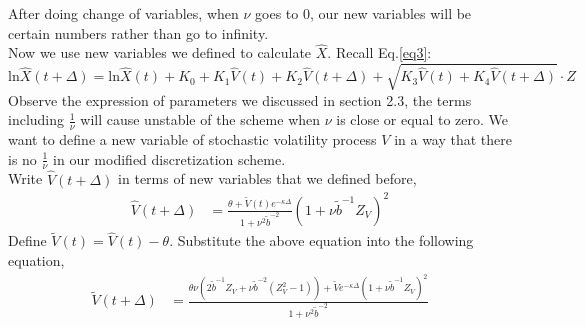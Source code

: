 \documentclass{ws-ijfe}
\begin{document}
After doing change of variables, when $\nu$ goes to $0$, our new variables will be certain numbers rather than go to infinity.\\
Now we use new variables we defined to calculate $\hat{X}$. Recall Eq.\eqref{eq3}:
\begin{equation*}
  \text{ln}\hat{X}(t+\Delta)=\text{ln}\hat{X}(t)+K_0+K_1\hat{V}(t)+K_2\hat{V}(t+\Delta)+\sqrt{K_3\hat{V}(t)+K_4\hat{V}(t+\Delta)}\cdot Z
\end{equation*}
Observe the expression of parameters we discussed in section 2.3, the terms including $\frac{1}{\nu}$ will cause unstable of the scheme when $\nu$ is close or equal to zero. We want to define a new variable of stochastic volatility process $V$ in a way that there is no $\frac{1}{\nu}$ in our modified discretization scheme.\\
Write $\hat{V}(t+\Delta)$ in terms of new variables that we defined before,
\begin{equation*}
\begin{split}
\hat{V}(t+\Delta)%
&=\frac{\theta+\tilde{V}(t)e^{-\kappa\Delta}}{1+\nu^2\tilde{b}^{-2}}(1+\nu\tilde{b}^{-1}Z_V)^2
\end{split}
\end{equation*}
Define $\tilde{V}(t)=\hat{V}(t)-\theta$.
Substitute the above equation into the following equation,
\begin{equation*}
\begin{split}
\tilde{V}(t+\Delta)%
&=\frac{\theta\nu(2\tilde{b}^{-1}Z_V+\nu\tilde{b}^{-2}(Z_V^2-1))+\tilde{V}e^{-\kappa\Delta}(1+\nu\tilde{b}^{-1}Z_V)^2}{1+\nu^2\tilde{b}^{-2}}
\end{split}
\end{equation*}
\end{document}
